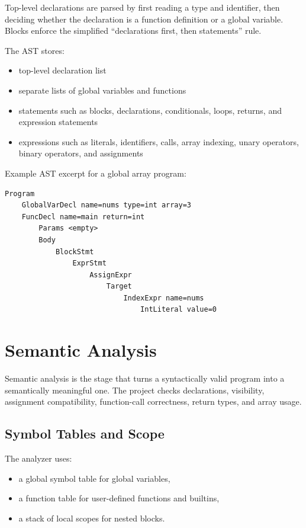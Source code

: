 \documentclass[11pt,a4paper]{article}
\begin{document}
Top-level declarations are parsed by first reading a type and identifier, then
deciding whether the declaration is a function definition or a global variable.
Blocks enforce the simplified ``declarations first, then statements'' rule.

The AST stores:

\begin{itemize}[leftmargin=2em]
    \item top-level declaration list
    \item separate lists of global variables and functions
    \item statements such as blocks, declarations, conditionals, loops, returns,
    and expression statements
    \item expressions such as literals, identifiers, calls, array indexing,
    unary operators, binary operators, and assignments
\end{itemize}

Example AST excerpt for a global array program:

\begin{lstlisting}
Program
    GlobalVarDecl name=nums type=int array=3
    FuncDecl name=main return=int
        Params <empty>
        Body
            BlockStmt
                ExprStmt
                    AssignExpr
                        Target
                            IndexExpr name=nums
                                IntLiteral value=0
\end{lstlisting}

\section{Semantic Analysis}

Semantic analysis is the stage that turns a syntactically valid program into a
semantically meaningful one. The project checks declarations, visibility,
assignment compatibility, function-call correctness, return types, and array
usage.

\subsection*{Symbol Tables and Scope}

The analyzer uses:

\begin{itemize}[leftmargin=2em]
    \item a global symbol table for global variables,
    \item a function table for user-defined functions and builtins,
    \item a stack of local scopes for nested blocks.
\end{itemize}
\end{document}
